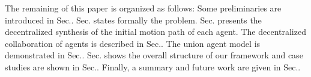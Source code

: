 \documentclass[journal]{IEEEtran}
\begin{document}
The remaining of this paper is organized as follows: Some preliminaries are introduced in Sec.\uppercase\expandafter{}. Sec.\uppercase\expandafter{} states formally the problem. Sec.\uppercase\expandafter{} presents the decentralized synthesis of the initial motion path of each agent. The decentralized collaboration of agents is described in Sec.\uppercase\expandafter{}. The union agent model is demonstrated in Sec.\uppercase\expandafter{}. Sec.\uppercase\expandafter{} shows the overall structure of our framework and case studies are shown in Sec.\uppercase\expandafter{}. Finally, a summary and future work are given in Sec.\uppercase\expandafter{}.






%
%
\end{document}

